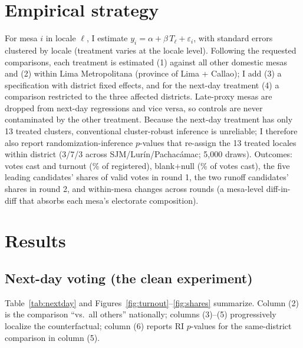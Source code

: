 \documentclass[11pt]{article}
\begin{document}
\begin{table}[H]\centering\small
\caption{Analysis groups}

\label{tab:desc}
\end{table}

\section{Empirical strategy}

For mesa $i$ in locale $\ell$, I estimate $y_{i} = \alpha + \beta\,T_{\ell} + \varepsilon_{i}$, with standard errors clustered by locale (treatment varies at the locale level). Following the requested comparisons, each treatment is estimated (1) against all other domestic mesas and (2) within Lima Metropolitana (province of Lima + Callao); I add (3) a specification with district fixed effects, and for the next-day treatment (4) a comparison restricted to the three affected districts. Late-proxy mesas are dropped from next-day regressions and vice versa, so controls are never contaminated by the other treatment. Because the next-day treatment has only 13 treated clusters, conventional cluster-robust inference is unreliable; I therefore also report randomization-inference $p$-values that re-assign the 13 treated locales within district (3/7/3 across SJM/Lurín/Pachacámac; 5,000 draws). Outcomes: votes cast and turnout (\% of registered), blank+null (\% of votes cast), the five leading candidates' shares of valid votes in round 1, the two runoff candidates' shares in round 2, and within-mesa changes across rounds (a mesa-level diff-in-diff that absorbs each mesa's electorate composition).

\section{Results}

\subsection{Next-day voting (the clean experiment)}

Table~\ref{tab:nextday} and Figures~\ref{fig:turnout}--\ref{fig:shares} summarize. Column (2) is the comparison ``vs.\ all others'' nationally; columns (3)--(5) progressively localize the counterfactual; column (6) reports RI $p$-values for the same-district comparison in column (5).

\begin{table}[t!]\centering\footnotesize
\caption{Effects of voting on April 13 (next-day mesas). SEs clustered by locale in parentheses. RI $p$-values from 5,000 within-district permutations of the 13 treated locales. *~$p<0.10$, **~$p<0.05$, ***~$p<0.01$.}

\label{tab:nextday}
\end{table}
\end{document}

